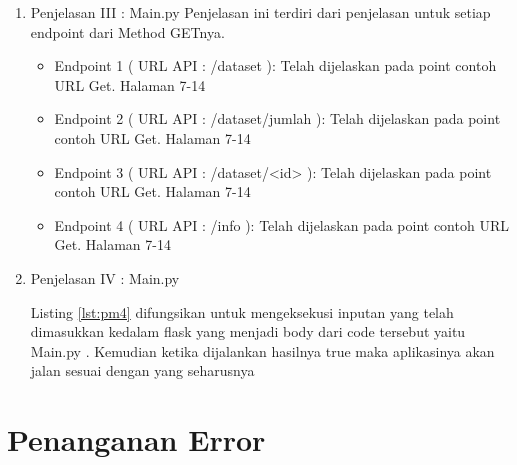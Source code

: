 \begin{enumerate}
\item Penjelasan III : Main.py
Penjelasan ini terdiri dari penjelasan untuk setiap endpoint dari Method GETnya.
\begin{itemize}
\item Endpoint 1 ( URL API : /dataset ): Telah dijelaskan pada point contoh URL Get. Halaman 7-14
\item Endpoint 2 ( URL API : /dataset/jumlah ): Telah dijelaskan pada point contoh URL Get. Halaman 7-14
\item Endpoint 3 ( URL API : /dataset/<id> ): Telah dijelaskan pada point contoh URL Get. Halaman 7-14
\item Endpoint 4 ( URL API : /info ): Telah dijelaskan pada point contoh URL Get. Halaman 7-14
\end{itemize}

\item Penjelasan IV : Main.py


Listing \ref{lst:pm4} difungsikan untuk mengeksekusi inputan yang telah dimasukkan kedalam flask yang menjadi body dari code tersebut yaitu Main.py . Kemudian ketika dijalankan hasilnya true maka aplikasinya akan jalan sesuai dengan yang seharusnya
\end{enumerate}

\section{Penanganan Error}
